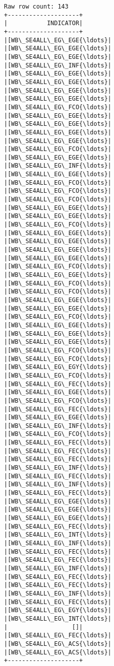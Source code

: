\documentclass[11pt]{article}
\begin{document}
    
    \begin{Verbatim}[commandchars=\\\{\}]
Raw row count: 143
+--------------------+
|           INDICATOR|
+--------------------+
|[WB\_SE4ALL\_EG\_EGE{\ldots}|
|[WB\_SE4ALL\_EG\_EGE{\ldots}|
|[WB\_SE4ALL\_EG\_EGE{\ldots}|
|[WB\_SE4ALL\_EG\_INF{\ldots}|
|[WB\_SE4ALL\_EG\_EGE{\ldots}|
|[WB\_SE4ALL\_EG\_EGE{\ldots}|
|[WB\_SE4ALL\_EG\_EGE{\ldots}|
|[WB\_SE4ALL\_EG\_EGE{\ldots}|
|[WB\_SE4ALL\_EG\_FCO{\ldots}|
|[WB\_SE4ALL\_EG\_EGE{\ldots}|
|[WB\_SE4ALL\_EG\_EGE{\ldots}|
|[WB\_SE4ALL\_EG\_EGE{\ldots}|
|[WB\_SE4ALL\_EG\_EGE{\ldots}|
|[WB\_SE4ALL\_EG\_FCO{\ldots}|
|[WB\_SE4ALL\_EG\_EGE{\ldots}|
|[WB\_SE4ALL\_EG\_INF{\ldots}|
|[WB\_SE4ALL\_EG\_EGE{\ldots}|
|[WB\_SE4ALL\_EG\_FCO{\ldots}|
|[WB\_SE4ALL\_EG\_FCO{\ldots}|
|[WB\_SE4ALL\_EG\_FCO{\ldots}|
|[WB\_SE4ALL\_EG\_EGE{\ldots}|
|[WB\_SE4ALL\_EG\_EGE{\ldots}|
|[WB\_SE4ALL\_EG\_FCO{\ldots}|
|[WB\_SE4ALL\_EG\_EGE{\ldots}|
|[WB\_SE4ALL\_EG\_EGE{\ldots}|
|[WB\_SE4ALL\_EG\_EGE{\ldots}|
|[WB\_SE4ALL\_EG\_EGE{\ldots}|
|[WB\_SE4ALL\_EG\_FCO{\ldots}|
|[WB\_SE4ALL\_EG\_EGE{\ldots}|
|[WB\_SE4ALL\_EG\_FCO{\ldots}|
|[WB\_SE4ALL\_EG\_FCO{\ldots}|
|[WB\_SE4ALL\_EG\_EGE{\ldots}|
|[WB\_SE4ALL\_EG\_EGE{\ldots}|
|[WB\_SE4ALL\_EG\_FCO{\ldots}|
|[WB\_SE4ALL\_EG\_EGE{\ldots}|
|[WB\_SE4ALL\_EG\_EGE{\ldots}|
|[WB\_SE4ALL\_EG\_EGE{\ldots}|
|[WB\_SE4ALL\_EG\_FCO{\ldots}|
|[WB\_SE4ALL\_EG\_FCO{\ldots}|
|[WB\_SE4ALL\_EG\_EGY{\ldots}|
|[WB\_SE4ALL\_EG\_FCO{\ldots}|
|[WB\_SE4ALL\_EG\_FEC{\ldots}|
|[WB\_SE4ALL\_EG\_EGE{\ldots}|
|[WB\_SE4ALL\_EG\_FCO{\ldots}|
|[WB\_SE4ALL\_EG\_FEC{\ldots}|
|[WB\_SE4ALL\_EG\_EGE{\ldots}|
|[WB\_SE4ALL\_EG\_INF{\ldots}|
|[WB\_SE4ALL\_EG\_FCO{\ldots}|
|[WB\_SE4ALL\_EG\_FEC{\ldots}|
|[WB\_SE4ALL\_EG\_FEC{\ldots}|
|[WB\_SE4ALL\_EG\_FEC{\ldots}|
|[WB\_SE4ALL\_EG\_INF{\ldots}|
|[WB\_SE4ALL\_EG\_FEC{\ldots}|
|[WB\_SE4ALL\_EG\_INF{\ldots}|
|[WB\_SE4ALL\_EG\_FEC{\ldots}|
|[WB\_SE4ALL\_EG\_EGE{\ldots}|
|[WB\_SE4ALL\_EG\_EGE{\ldots}|
|[WB\_SE4ALL\_EG\_EGE{\ldots}|
|[WB\_SE4ALL\_EG\_FEC{\ldots}|
|[WB\_SE4ALL\_EG\_INT{\ldots}|
|[WB\_SE4ALL\_EG\_INF{\ldots}|
|[WB\_SE4ALL\_EG\_FEC{\ldots}|
|[WB\_SE4ALL\_EG\_FEC{\ldots}|
|[WB\_SE4ALL\_EG\_INF{\ldots}|
|[WB\_SE4ALL\_EG\_FEC{\ldots}|
|[WB\_SE4ALL\_EG\_FEC{\ldots}|
|[WB\_SE4ALL\_EG\_INF{\ldots}|
|[WB\_SE4ALL\_EG\_FEC{\ldots}|
|[WB\_SE4ALL\_EG\_EGY{\ldots}|
|[WB\_SE4ALL\_EG\_INT{\ldots}|
|                  []|
|[WB\_SE4ALL\_EG\_FEC{\ldots}|
|[WB\_SE4ALL\_EG\_ACS{\ldots}|
|[WB\_SE4ALL\_EG\_ACS{\ldots}|
+--------------------+

    \end{Verbatim}
\end{document}
